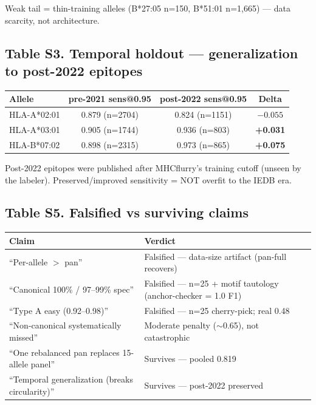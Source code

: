 \documentclass[11pt]{article}
\begin{document}
Weak tail = thin-training alleles (B*27:05 n=150, B*51:01 n=1,665) --- data scarcity, not architecture.

\subsection*{Table S3. Temporal holdout --- generalization to post-2022 epitopes}
\begin{table}[h]
\centering
\begin{tabular}{@{}lccc@{}}
\toprule
Allele & pre-2021 sens@0.95 & post-2022 sens@0.95 & Delta \\
\midrule
HLA-A*02:01 & 0.879 (n=2704) & 0.824 (n=1151) & $-0.055$ \\
HLA-A*03:01 & 0.905 (n=1744) & 0.936 (n=803) & \textbf{+0.031} \\
HLA-B*07:02 & 0.898 (n=2315) & 0.973 (n=865) & \textbf{+0.075} \\
\bottomrule
\end{tabular}
\end{table}

Post-2022 epitopes were published after MHCflurry's training cutoff (unseen by the
labeler). Preserved/improved sensitivity = NOT overfit to the IEDB era.

\subsection*{Table S5. Falsified vs surviving claims}
\begin{table}[h]
\centering
\begin{tabular}{@{}ll@{}}
\toprule
Claim & Verdict \\
\midrule
``Per-allele $>$ pan'' & Falsified --- data-size artifact (pan-full recovers) \\
``Canonical 100\% / 97--99\% spec'' & Falsified --- n=25 + motif tautology (anchor-checker = 1.0 F1) \\
``Type A easy (0.92--0.98)'' & Falsified --- n=25 cherry-pick; real 0.48 \\
``Non-canonical systematically missed'' & Moderate penalty ($\sim$0.65), not catastrophic \\
``One rebalanced pan replaces 15-allele panel'' & Survives --- pooled 0.819 \\
``Temporal generalization (breaks circularity)'' & Survives --- post-2022 preserved \\
\bottomrule
\end{tabular}
\end{table}
\end{document}
